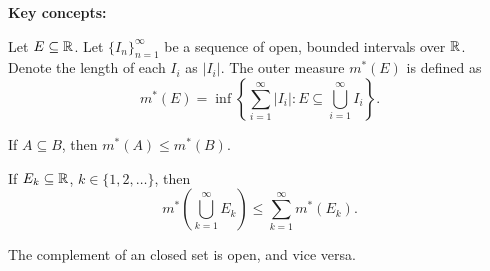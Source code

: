 \documentclass[class=book, crop=false]{standalone}
\begin{document}
    \noindent \textbf{Key concepts:}
    \begin{defIndep}
        Let $E \subseteq \mathbb{R}$. Let $\{I_n\}^{\infty}_{n = 1}$ be a sequence of open, bounded intervals over $\mathbb{R}$. Denote the length of each $I_i$ as $|I_i|$. The outer measure $m^*(E)$ is defined as
        \begin{equation*}
            m^*(E) = \inf\left\{\sum^{\infty}_{i = 1} |I_i| : E \subseteq \bigcup^{\infty}_{i = 1} I_i\right\}.
        \end{equation*}
    \end{defIndep}
    \begin{theoremIndep}[Monotonicity]
        If $A \subseteq B$, then $m^*(A) \leq m^*(B)$.
    \end{theoremIndep}
    \begin{theoremIndep}[Subadditivity]
        If $E_k \subseteq \mathbb{R}$, $k \in \{1, 2, \dots\}$, then
        \begin{equation*}
            m^*\left(\bigcup^{\infty}_{k = 1} E_k\right) \leq \sum^{\infty}_{k = 1} m^*(E_k).
        \end{equation*}
    \end{theoremIndep}
    \begin{theoremIndep}
        The complement of an closed set is open, and vice versa.
    \end{theoremIndep}
\end{document}
